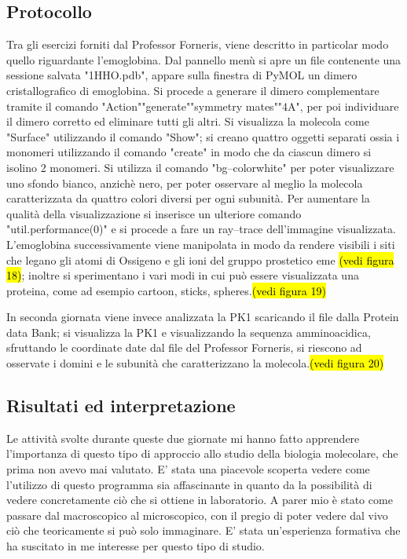 \documentclass[twocolumn,a4paper,10pt]{my_report}
\begin{document}
{{\subsection*{Protocollo}
Tra gli esercizi forniti dal Professor Forneris, viene descritto in particolar modo quello riguardante l'emoglobina. Dal pannello menù si apre un file contenente una sessione salvata "1HHO.pdb", appare sulla finestra di PyMOL un dimero cristallografico di emoglobina.
Si procede a generare il dimero complementare tramite il comando "Action"\textrightarrow"generate"\textrightarrow"symmetry mates"\textrightarrow "4A", per poi individuare il dimero corretto ed eliminare tutti gli altri.
Si visualizza la molecola come "Surface" utilizzando il comando "Show"; si creano quattro oggetti separati ossia i monomeri utilizzando il comando "create" in modo che da ciascun dimero si isolino 2 monomeri.
Si utilizza il comando "bg--colorwhite" per poter visualizzare uno sfondo bianco, anzichè nero, per poter osservare al meglio la molecola caratterizzata da quattro colori diversi per ogni subunità.
Per aumentare la qualità della visualizzazione si inserisce un ulteriore comando "util.performance(0)" e si procede a fare un ray--trace dell'immagine visualizzata.
L'emoglobina successivamente viene manipolata in modo da rendere visibili i siti che legano gli atomi di Ossigeno e gli ioni  del gruppo prostetico eme \hl{(vedi figura 18)}; inoltre si sperimentano i vari modi in cui può essere visualizzata una proteina, come ad esempio cartoon, sticks, spheres.\hl{(vedi figura 19)}

In seconda giornata viene invece analizzata la PK1 scaricando il file dalla Protein data Bank; si visualizza la PK1 e visualizzando la sequenza amminoacidica, sfruttando le coordinate date dal file del Professor Forneris, si riescono ad osservate i domini e le subunità che caratterizzano la molecola.\hl{(vedi figura 20)}

\subsection*{Risultati ed interpretazione}
Le attività svolte durante queste due giornate mi hanno fatto apprendere l'importanza di questo tipo di approccio allo studio della biologia molecolare, che prima non avevo mai valutato. E' stata una piacevole scoperta vedere come l'utilizzo di questo programma sia affascinante in quanto da la possibilità di vedere concretamente ciò che si ottiene in laboratorio. A parer mio è stato come passare dal macroscopico al microscopico, con il pregio di poter vedere dal vivo ciò che teoricamente si può solo immaginare.
E' stata un'esperienza formativa che ha suscitato in me interesse per questo tipo di studio.

}}
\end{document}
